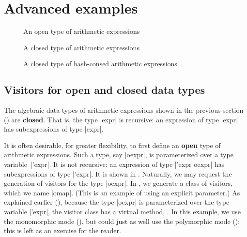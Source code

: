 \documentclass[11pt,a4paper,twoside]{article}
\renewcommand{\emph}[1]{\textbf{#1}}
\begin{document}
\section{Advanced examples}
\label{sec:advanced}


\begin{figure}[p]
\vspace{-\baselineskip}
\caption{An open type of arithmetic expressions} %
\label{fig:expr12}
\end{figure}

\begin{figure}[p]
\caption{A closed type of arithmetic expressions}
\label{fig:expr13}
\end{figure}

\begin{figure}[p]
\caption{A closed type of hash-consed arithmetic expressions}
\label{fig:expr08}
\end{figure}

\subsection{Visitors for open and closed data types}
\label{sec:advanced:openclosed}

The algebraic data types of arithmetic expressions shown in the previous
section () are \emph{closed}. That is, the type \oc|expr|
is recursive: an expression of type \oc|expr| has subexpressions of type
\oc|expr|.

It is often desirable, for greater flexibility, to first define an \emph{open}
type of arithmetic expressions. Such a type, say \oc|oexpr|, is parameterized
over a type variable~\oc|'expr|. It is not recursive: an expression of type
\oc|'expr oexpr| has subexpressions of type \oc|'expr|. It is shown in
. Naturally, we may request the generation of visitors for
the type \oc|oexpr|. In , we generate a class of \map
visitors, which we name \oc|omap|. (This is an example of using an explicit
\name parameter.) As explained earlier (),
because the type \oc|oexpr| is parameterized over the type variable
\oc|'expr|, the visitor class has a virtual method, .
%
In this example, we use the monomorphic mode (),
but could just as well use the polymorphic mode ():
this is left as an exercise for the reader.
\end{document}
